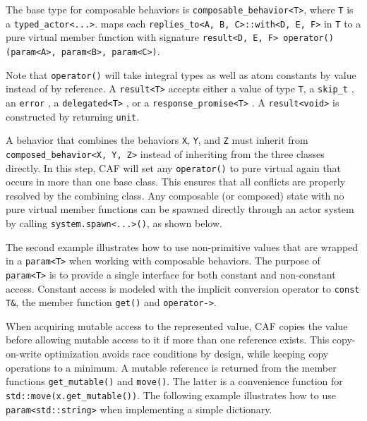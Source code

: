 The base type for composable behaviors is \lstinline^composable_behavior<T>^, where \lstinline^T^ is a \lstinline^typed_actor<...>^. \lib maps each \lstinline^replies_to<A, B, C>::with<D, E, F>^ in \lstinline^T^ to a pure virtual member function with signature \lstinline^result<D, E, F> operator()(param<A>, param<B>, param<C>)^.

Note that \lstinline^operator()^ will take integral types as well as atom constants by value instead of by reference. A \lstinline^result<T>^ accepts either a value of type \lstinline^T^, a \lstinline^skip_t^ , an \lstinline^error^ , a \lstinline^delegated<T>^ , or a \lstinline^response_promise<T>^ . A \lstinline^result<void>^ is constructed by returning \lstinline^unit^.

A behavior that combines the behaviors \lstinline^X^, \lstinline^Y^, and \lstinline^Z^ must inherit from \lstinline^composed_behavior<X, Y, Z>^ instead of inheriting from the three classes directly. In this step, CAF will set any \lstinline^operator()^ to pure virtual again that occurs in more than one base class. This ensures that all conflicts are properly resolved by the combining class. Any composable (or composed) state with no pure virtual member functions can be spawned directly through an actor system by calling \lstinline^system.spawn<...>()^, as shown below.



\clearpage
The second example illustrates how to use non-primitive values that are wrapped in a \lstinline^param<T>^ when working with composable behaviors. The purpose of \lstinline^param<T>^ is to provide a single interface for both constant and non-constant access. Constant access is modeled with the implicit conversion operator to \lstinline^const T&^, the member function \lstinline^get()^ and \lstinline^operator->^. 

When acquiring mutable access to the represented value, CAF copies the value before allowing mutable access to it if more than one reference exists. This copy-on-write optimization avoids race conditions by design, while keeping copy operations to a minimum. A mutable reference is returned from the member functions \lstinline^get_mutable()^ and \lstinline^move()^. The latter is a convenience function for \lstinline^std::move(x.get_mutable())^. The following example illustrates how to use \lstinline^param<std::string>^ when implementing a simple dictionary.

